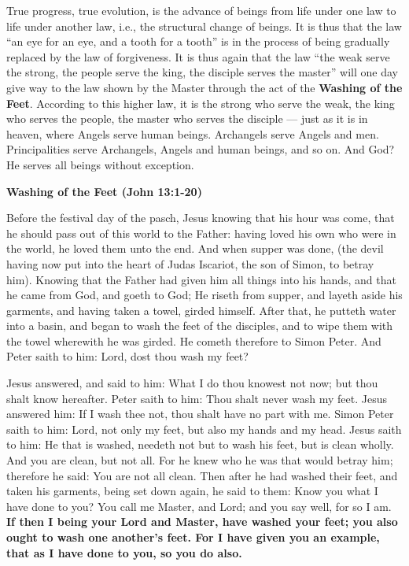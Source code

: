 \begin{quotex}
True progress, true evolution, is the advance of beings from life under one law to life under another law, i.e., the structural change of beings. It is thus that the law ``an eye for an eye, and a tooth for a tooth'' is in the process of being gradually replaced by the law of forgiveness. It is thus again that the law ``the weak serve the strong, the people serve the king, the disciple serves the master'' will one day give way to the law shown by the Master through the act of the \textbf{Washing of the Feet}. According to this higher law, it is the strong who serve the weak, the king who serves the people, the master who serves the disciple — just as it is in heaven, where Angels serve human beings. Archangels serve Angels and men. Principalities serve Archangels, Angels and human beings, and so on. And God? He serves all beings without exception. 

\end{quotex}

\textbf{Washing of the Feet (John 13:1-20)}

Before the festival day of the pasch, Jesus knowing that his hour was come, that he should pass out of this world to the Father: having loved his own who were in the world, he loved them unto the end. And when supper was done, (the devil having now put into the heart of Judas Iscariot, the son of Simon, to betray him). Knowing that the Father had given him all things into his hands, and that he came from God, and goeth to God; He riseth from supper, and layeth aside his garments, and having taken a towel, girded himself. After that, he putteth water into a basin, and began to wash the feet of the disciples, and to wipe them with the towel wherewith he was girded. He cometh therefore to Simon Peter. And Peter saith to him: Lord, dost thou wash my feet?

Jesus answered, and said to him: What I do thou knowest not now; but thou shalt know hereafter. Peter saith to him: Thou shalt never wash my feet. Jesus answered him: If I wash thee not, thou shalt have no part with me. Simon Peter saith to him: Lord, not only my feet, but also my hands and my head. Jesus saith to him: He that is washed, needeth not but to wash his feet, but is clean wholly. And you are clean, but not all. For he knew who he was that would betray him; therefore he said: You are not all clean. Then after he had washed their feet, and taken his garments, being set down again, he said to them: Know you what I have done to you? You call me Master, and Lord; and you say well, for so I am. \textbf{If then I being your Lord and Master, have washed your feet; you also ought to wash one
another's feet. For I have given you an example, that as I have done to you, so you do also.}

